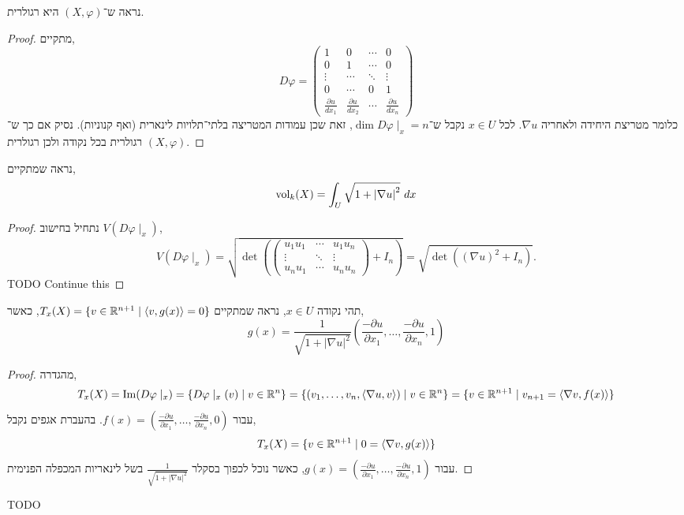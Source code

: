 \subquestion{}
נראה ש־$(X, \varphi)$ היא רגולרית.
\begin{proof}
	מתקיים,
	\[
		D\varphi
		= \begin{pmatrix}
			1 & 0 & \cdots & 0 \\
			0 & 1 & \cdots & 0 \\
			\vdots & \cdots & \ddots & \vdots \\
			0 & \cdots & 0 & 1 \\
			\frac{\partial u}{d x_1} & \frac{\partial u}{d x_2} & \cdots & \frac{\partial u}{d x_n}
		\end{pmatrix}
	\]
	כלומר מטריצת היחידה ולאחריה $\nabla u$.
	לכל $x \in U$ נקבל ש־$\dim D\varphi \mid_x = n$, זאת שכן עמודות המטריצה בלתי־תלויות לינארית (ואף קנוניות).
	נסיק אם כך ש־$(X, \varphi)$ רגולרית בכל נקודה ולכן רגולרית.
\end{proof}

\subquestion{}
נראה שמתקיים,
\[
	\operatorname{vol}_k(X)
	= \int_U \sqrt{1 + {|\nabla u|}^2}\ dx
\]
\begin{proof}
	נתחיל בחישוב $V(D\varphi \mid_x)$,
	\[
		V(D \varphi \mid_x)
		= \sqrt{\det\left(\begin{pmatrix}
				u_1 u_1 & \cdots & u_1 u_n \\
				\vdots & \ddots & \vdots \\
				u_n u_1 & \cdots & u_n u_n
		\end{pmatrix} + I_n\right)}
		= \sqrt{\det\left({(\nabla u)}^2 + I_n\right)}
	.\]
	TODO Continue this
\end{proof}

\subquestion{}
תהי נקודה $x \in U$, נראה שמתקיים $T_x(X) = \{v \in \mathbb{R}^{n + 1} \mid \langle v, g(x) \rangle = 0 \}$, כאשר,
\[
	g(x)
	= \frac{1}{\sqrt{1 + {|\nabla u|}^2}} \left( \frac{-\partial u}{\partial x_1}, \ldots, \frac{-\partial u}{\partial x_n}, 1 \right)
\]
\begin{proof}
	מהגדרה,
	\[
		T_x(X)
		= \operatorname{Im}(D \varphi \mid_x)
		= \{ D \varphi \mid_x(v) \mid v \in \mathbb{R}^n \}
		= \{ (v_1, \ldots, v_n, \langle \nabla u, v \rangle) \mid v \in \mathbb{R}^n \}
		= \{ v \in \mathbb{R}^{n + 1} \mid v_{n + 1} = \langle \nabla v, f(x) \rangle \}
	\]
	עבור $f(x) = \left( \frac{-\partial u}{\partial x_1}, \ldots, \frac{-\partial u}{\partial x_n}, 0 \right)$.
	בהעברת אגפים נקבל,
	\[
		T_x(X)
		= \{ v \in \mathbb{R}^{n + 1} \mid 0 = \langle \nabla v, g(x) \rangle \}
	\]
	עבור $g(x) = \left( \frac{-\partial u}{\partial x_1}, \ldots, \frac{-\partial u}{\partial x_n}, 1 \right)$, כאשר נוכל לכפוך בסקלר $\frac{1}{\sqrt{1 + {|\nabla u|}^2}}$ בשל לינאריות המכפלה הפנימית.
\end{proof}

\subquestion{}
TODO


